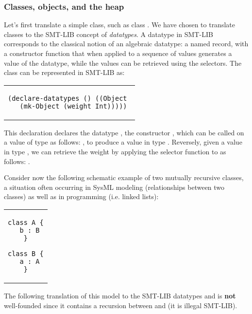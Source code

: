 \subsubsection{Classes, objects, and the heap}

Let's first translate a simple class, such as class .
We have chosen to translate classes to the SMT-LIB concept of {\em 
datatypes}. A datatype in SMT-LIB corresponds to the classical 
notion of an algebraic datatype: a named record, with a constructor 
function  that when applied to a sequence of values generates a 
value of the  datatype, while the values can be retrieved using the 
selectors.  The class  can be  represented in SMT-LIB 
as:

\lstset{language=SMT}

\begin{center}
\begin{tabular}{c}
\begin{lstlisting}
(declare-datatypes () ((Object 
  (mk-Object (weight Int)))))
\end{lstlisting}
\end{tabular}
\end{center}

This declaration declares the datatype , the 
constructor , which can be called on a value 
 of type  as follows: , to 
produce a value in type . Reversely, given a value 
 in type , we can retrieve the weight by 
applying the selector function  to  as 
follows: .

Consider now the following schematic example of two
mutually recursive classes, a situation often occurring in SysML modeling (relationships between two classes) as well as in programming (i.e. linked lists):

\lstset{language=K}

\begin{center}
\begin{tabular}{c}
\begin{lstlisting}
class A {
  b : B
}

class B {
  a : A
}
\end{lstlisting}
\end{tabular}
\end{center}

The following translation of this model to the SMT-LIB datatypes  and  is {\bf not} well-founded since it contains a recursion between  and  (it is illegal SMT-LIB).

